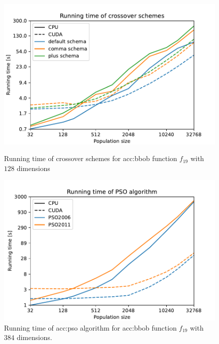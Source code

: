 \begin{figure}
    \begin{minipage}[t]{0.48\textwidth}
        \includegraphics[width=\textwidth]{img/runs/time_es_schema_with_legend.pdf}
        \caption[Running time of crossover schemes]{Running time of crossover schemes for \acrshort{acc:bbob} function $f_{19}$ with $128$ dimensions}
        \label{fig:esscemetime}
    \end{minipage}
    \hfill
    \begin{minipage}[t]{0.48\textwidth}
        \includegraphics[width=\textwidth]{img/runs/time_pso_with_legend.pdf}
        \caption[Running time of \acrshort*{acc:pso}]{Running time of \acrshort{acc:pso} algorithm for \acrshort{acc:bbob} function $f_{19}$ with $384$ dimensions.}
        \label{fig:psotime}
    \end{minipage}


\end{figure}
